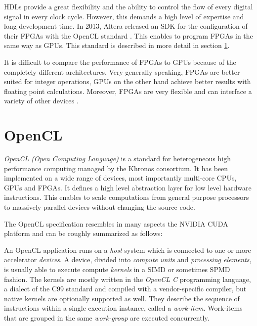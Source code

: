 HDLs provide a great flexibility and the ability to control the flow of every digital signal in every clock cycle.
However, this demands a high level of expertise and long development time.
In 2013, Altera released an SDK for the configuration of their FPGAs with the OpenCL standard \cite{altera_opencl}.
This enables to program FPGAs in the same way as GPUs.
This standard is described in more detail in section \ref{section:opencl}.

It is difficult to compare the performance of FPGAs to GPUs because of the completely different architectures.
Very generally speaking, FPGAs are better suited for integer operations, GPUs on the other hand achieve better results with floating point calculations.
Moreover, FPGAs are very flexible and can interface a variety of other devices \cite{chimera}.





\section{OpenCL}
\label{section:opencl}


\emph{OpenCL (Open Computing Language)}\cite{opencl} is a standard for heterogeneous high performance computing managed by the Khronos consortium.
It has been implemented on a wide range of devices, most importantly multi-core CPUs, GPUs and FPGAs.
It defines a high level abstraction layer for low level hardware instructions.
This enables to scale computations from general purpose processors to massively parallel devices without changing the source code.




The OpenCL specification resembles in many aspects the NVIDIA CUDA platform and can be roughly summarized as follows\cite{opencl}:

An OpenCL application runs on a \emph{host} system which is connected to one or more accelerator \emph{devices}.
A device, divided into \emph{compute units} and \emph{processing elements}, is usually able to execute compute \emph{kernels} in a SIMD or sometimes SPMD fashion.
The kernels are mostly written in the \emph{OpenCL C} programming language, a dialect of the C99 standard and compiled with a vendor-specific compiler, but native kernels are optionally supported as well.
They describe the sequence of instructions within a single execution instance, called a \emph{work-item}.
Work-items that are grouped in the same \emph{work-group} are executed concurrently.


